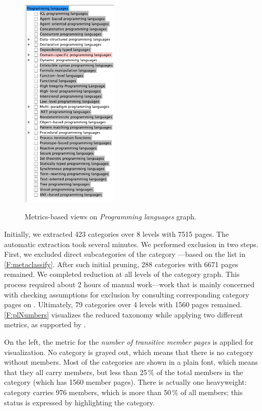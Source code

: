 \begin{figure}[t!]
{\noindent \includegraphics[width=0.41\textwidth]{figures/plSubcategoriesTransitive.png}
}

\vspace{-42\in}

\caption{Metrics-based views on \emph{Programming languages} graph.}
\label{F:plNumbers}
\vspace{-42\in}
\end{figure}


Initially, we extracted 423 categories over 8 levels with 7515 pages. The automatic extraction took several minutes. We performed exclusion in two steps. First, we excluded direct subcategories of the category ---based on the list in \autoref{F:metaclassify}. After such initial pruning, 288 categories with 6671 pages remained. We completed reduction at all levels of the category graph. This process required about 2 hours of manual work---work that is mainly concerned with checking assumptions for exclusion by consulting corresponding category pages on \Wikipedia. Ultimately, 79 categories over 4 levels with 1560 pages remained.  \autoref{F:plNumbers} visualizes the reduced taxonomy while applying two different metrics, as supported by \WikiTax.

On the left, the metric for the \emph{number of transitive member pages} is applied for visualization. No category is grayed out, which means that there is no category without members. Most of the categories are shown in a plain font, which means that they all carry members, but less than 25\,\% of the total members in the category  (which has 1560 member pages). There is actually one heavyweight: category  carries 976 members, which is more than 50\,\% of all members; this status is expressed by 
highlighting the category.

